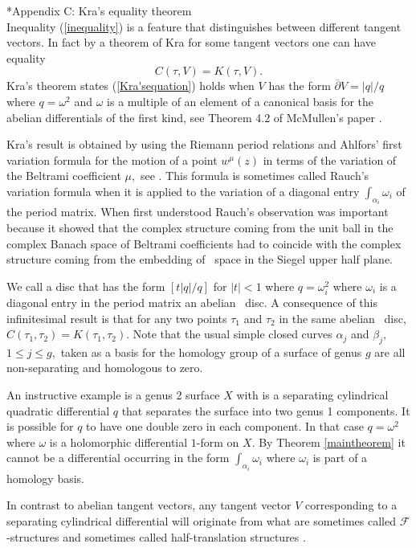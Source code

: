 \documentclass[12pt]{amsart}
\theoremstyle{remark}
\theoremstyle{definition}
\theoremstyle{definition}
\begin{document}
\begin{section}*{Appendix C: Kra's equality theorem\ \  \ \  \ \ \ \ \ \ \ \ \ \ \ \ \ \ \ \ \  \  \ \ \ \ \ \ \ \ \ \ \ \ \ \ \ }
  Inequality (\ref{inequality})  is a feature that distinguishes between different tangent vectors. In fact by a theorem of  Kra \cite{Kra1}  for some tangent vectors one can have equality
 \begin{equation}\label{Kra'sequation}C(\tau,V)=K(\tau,V).
 \end{equation}
 Kra's theorem states (\ref{Kra'sequation}) holds when $V$ has the form
$\overline{\partial}V=|q|/q$ where $q = \omega^2$  and $\omega$ is a multiple of an element of a canonical basis for the abelian differentials of the first kind, see Theorem 4.2 of McMullen's paper \cite{McM10}.


  Kra's result 
is obtained by using the Riemann period relations and  Ahlfors' first variation formula for the motion of a point $w^{\mu}(z)$ in terms of the variation of the Beltrami coefficient $\mu,$ see \cite{Ahlforsbook5}.  This formula is sometimes called Rauch's variation formula  \cite{Rauch} when it is applied to  the variation of a diagonal
entry $\int_{\alpha_i} \omega_i$ of the period matrix.  
When first understood Rauch's observation was important because it showed that the complex structure coming from the unit ball in the complex Banach space of Beltrami coefficients had to coincide with the complex structure coming from the embedding of \te\ space in the Siegel upper half plane.



We call a disc that has the form $[t|q|/q]$ for $|t|<1$
where $q=\omega_i^2$  where $\omega_i$ is a diagonal entry in the period matrix an abelian \te\ disc.  
A consequence of this infinitesimal result is that for any two points  ${\tau_1}$ 
and ${\tau_2}$ in the same abelian \te\ disc, $C({\tau_1},{\tau_2})=K({\tau_1},{\tau_2}).$ 
Note that the usual simple closed curves $\alpha_j$ and $\beta_j,$  $1\leq j \leq g,$ taken as a basis for  the homology group of a surface of genus $g$ are all non-separating and homologous to zero.

  

 An instructive example is a  genus 2 surface $X$ with is a separating cylindrical quadratic differential  $q$
that separates the surface into two genus 1 components.  It is possible for $q$ to have one double zero in each  component.  In that case $q=\omega^2$ where $\omega$ is a holomorphic differential $1$-form on $X.$  By Theorem \ref{maintheorem} it cannot be a differential occurring in the form $\int_{\alpha_i} \omega_i$
where $\omega_i$ is part of a homology basis.

In contrast to  abelian tangent vectors, any tangent vector $V$  corresponding to a separating cylindrical differential will originate from what are  sometimes called ${\mathcal F}$-structures \cite{EarleGardiner1} and sometimes called  half-translation structures  \cite{FortierBourqueRafi}.    \end{section}
\end{document}
